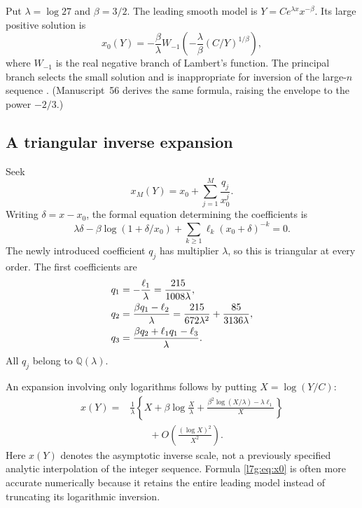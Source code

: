\documentclass[11pt,letterpaper]{article}
\theoremstyle{remark}\newtheorem{remark}[theorem]{Remark}
\newcommand{\Q}{\mathbb Q}\newcommand{\tht}{\vartheta}
\newcounter{l7gtrsavedeq}
\begin{document}
Put $\lambda=\log27$ and $\beta=3/2$. The leading smooth model is
$Y=C e^{\lambda x}x^{-\beta}$. Its large positive solution is
\begin{equation}\label{l7g:eq:x0}
 x_0(Y)=-\frac{\beta}{\lambda}
 W_{-1}\!\left(-\frac{\lambda}{\beta}(C/Y)^{1/\beta}\right),
\end{equation}
where $W_{-1}$ is the real negative branch of Lambert's function.
The principal branch selects the small solution and is inappropriate
for inversion of the large-$n$ sequence \cite[\S4.13]{l7g:dlmf}.
(Manuscript~56 derives the same formula, raising the envelope to the
power $-2/3$.)

\subsection{A triangular inverse expansion}

Seek
\begin{equation}\label{l7g:eq:inverse}
 x_M(Y)=x_0+\sum_{j=1}^{M}\frac{q_j}{x_0^j}.
\end{equation}
Writing $\delta=x-x_0$, the formal equation determining the coefficients
is
\begin{equation}\label{l7g:eq:inverseeq}
 \lambda\delta-\beta\log(1+\delta/x_0)
       +\sum_{k\ge1}\ell_k(x_0+\delta)^{-k}=0.
\end{equation}
The newly introduced coefficient $q_j$ has multiplier $\lambda$, so
this is triangular at every order. The first coefficients are
\begin{align}\label{l7g:eq:qvalues}
 q_1&=-\frac{\ell_1}{\lambda}
       =\frac{215}{1008\lambda},\notag\\
 q_2&=\frac{\beta q_1-\ell_2}{\lambda}
       =\frac{215}{672\lambda^2}+\frac{85}{3136\lambda},\notag\\
 q_3&=\frac{\beta q_2+\ell_1q_1-\ell_3}{\lambda}.
\end{align}
All $q_j$ belong to $\Q(\lambda)$.

An expansion involving only logarithms follows by putting
$X=\log(Y/C)$:
\begin{equation}\label{l7g:eq:pureloginverse}
\begin{split}
 x(Y)={}&\frac1\lambda\left\{
 X+\beta\log\frac X\lambda
 +\frac{\beta^2\log(X/\lambda)-\lambda\ell_1}{X}\right\}\\
 &\hspace{2em}+O\!\left(\frac{(\log X)^2}{X^2}\right).
\end{split}
\end{equation}
Here $x(Y)$ denotes the asymptotic inverse scale, not a previously
specified analytic interpolation of the integer sequence. Formula
\eqref{l7g:eq:x0} is often more accurate numerically because it retains the
entire leading model instead of truncating its logarithmic inversion.
\end{document}
